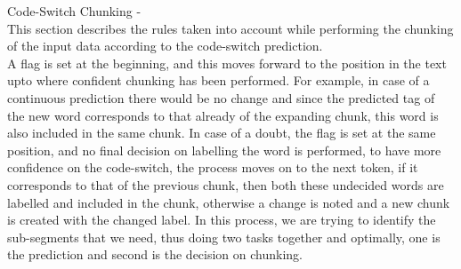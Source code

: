 \documentclass[11pt]{article}
\begin{document}
Code-Switch Chunking - \\

This section describes the rules taken into account while performing the chunking of the input data according to the code-switch prediction. \\

A flag is set at the beginning, and this moves forward to the position in the text upto where confident chunking has been performed. For example, in case of a continuous prediction there would be no change and since the predicted tag of the new word corresponds to that already of the expanding chunk, this word is also included in the same chunk. In case of a doubt, the flag is set at the same position, and no final decision on labelling the word is performed, to have more confidence on the code-switch, the process moves on to the next token, if it corresponds to that of the previous chunk, then both these undecided words are labelled and included in the chunk, otherwise a change is noted and a new chunk is created with the changed label. In this process, we are trying to identify the sub-segments that we need, thus doing two tasks together and optimally, one is the prediction and second is the decision on chunking. \\





%
%

\end{document}
